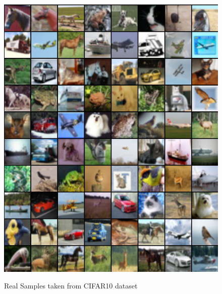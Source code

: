 \begin{figure}[H]
\begin{center}
\includegraphics[height=.88\textheight]{Chapter6/Figs/realsamples.png}
\label{fig:RealSamples}
\caption{Real Samples taken from CIFAR10 dataset}
\end{center}
\end{figure}



